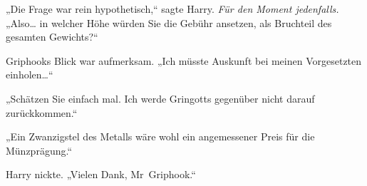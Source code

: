 „Die Frage war rein hypothetisch,“ sagte Harry. \emph{Für den Moment jedenfalls.} „Also… in welcher Höhe würden Sie die Gebühr ansetzen, als Bruchteil des gesamten Gewichts?“

Griphooks Blick war aufmerksam. „Ich müsste Auskunft bei meinen Vorgesetzten einholen…“

„Schätzen Sie einfach mal. Ich werde Gringotts gegenüber nicht darauf zurückkommen.“

„Ein Zwanzigstel des Metalls wäre wohl ein angemessener Preis für die Münzprägung.“

Harry nickte. „Vielen Dank, Mr~Griphook.“

